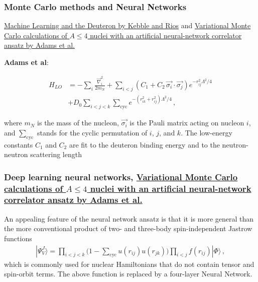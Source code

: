 \documentclass{beamer}
\begin{document}
\begin{frame}
\frametitle{Monte Carlo methods and Neural Networks}

\href{{https://www.sciencedirect.com/science/article/pii/S0370269320305463?via%3Dihub}}{Machine Learning and the Deuteron by Kebble and Rios} and
\href{{https://journals.aps.org/prl/abstract/10.1103/PhysRevLett.127.022502}}{Variational Monte Carlo calculations of $A\le 4$ nuclei with an artificial neural-network correlator ansatz by Adams et al.}

\textbf{Adams et al}:

\begin{align}
H_{LO} &=-\sum_i \frac{{\vec{\nabla}_i^2}}{2m_N}
+\sum_{i<j} {\left(C_1  + C_2\, \vec{\sigma_i}\cdot\vec{\sigma_j}\right)
e^{-r_{ij}^2\Lambda^2 / 4 }}
\nonumber\\
&+D_0 \sum_{i<j<k} \sum_{\text{cyc}}
{e^{-\left(r_{ik}^2+r_{ij}^2\right)\Lambda^2/4}}\,,
\end{align}

where $m_N$ is the mass of the nucleon, $\vec{\sigma_i}$ is the Pauli
matrix acting on nucleon $i$, and $\sum_{\text{cyc}}$ stands for the
cyclic permutation of $i$, $j$, and $k$. The low-energy constants
$C_1$ and $C_2$ are fit to the deuteron binding energy and to the
neutron-neutron scattering length
\end{frame}

\begin{frame}
\frametitle{Deep learning neural networks, \href{{https://journals.aps.org/prl/abstract/10.1103/PhysRevLett.127.022502}}{Variational Monte Carlo calculations of $A\le 4$ nuclei with an artificial neural-network correlator ansatz by Adams et al.}}

An appealing feature of the neural network ansatz is that it is more general than the more conventional product of two-
and three-body spin-independent Jastrow functions
\begin{align}
|\Psi_V^J \rangle = \prod_{i<j<k} \Big( 1-\sum_{\text{cyc}} u(r_{ij}) u(r_{jk})\Big) \prod_{i<j} f(r_{ij}) | \Phi\rangle\,,
\end{align}
which is commonly used for nuclear Hamiltonians that do not contain tensor and spin-orbit terms.
The above function is replaced by a four-layer Neural Network.
\end{frame}
\end{document}
